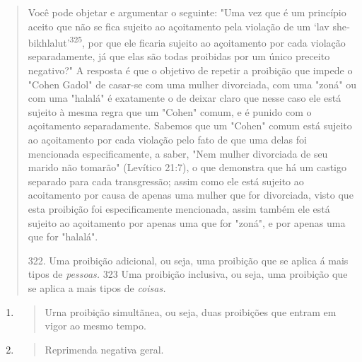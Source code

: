 \begin{quote}
Você pode objetar e argumentar o seguinte: "Uma vez que é um prin­cípio
aceito que não se fica sujeito ao açoitamento pela violação de um `lav
she­bikhlalut'\textsuperscript{325}, por que ele ficaria sujeito ao
açoitamento por cada violação sepa­radamente, já que elas são todas
proibidas por um único preceito negativo?" A resposta é que o objetivo
de repetir a proibição que impede o "Cohen Gadol" de casar-se com uma
mulher divorciada, com uma "zoná" ou com uma "halalá" é exatamente o de
deixar claro que nesse caso ele está sujeito à mesma regra que um
"Cohen" comum, e é punido com o açoitamento separadamente. Sabe­mos que
um "Cohen" comum está sujeito ao açoitamento por cada violação pe­lo
fato de que uma delas foi mencionada especificamente, a saber, "Nem
mulher divorciada de seu marido não tomarão" (Levítico 21:7), o que
demonstra que há um castigo separado para cada transgressão; assim como
ele está sujeito ao acoitamento por causa de apenas uma mulher que for
divorciada, visto que esta proibição foi especificamente mencionada,
assim também ele está sujeito ao açoi­tamento por apenas uma que for
"zoná", e por apenas uma que for "halalá".

322. Uma proibição adicional, ou seja, uma proibição que se aplica á
mais tipos de \emph{pessoas.} 323 Uma proibição inclusiva, ou seja, uma
proibição que se aplica a mais tipos de \emph{coisas.}
\end{quote}

\begin{enumerate}
\def\labelenumi{\arabic{enumi}.}
\setcounter{enumi}{323}
\item
  \begin{quote}
  Urna proibição simultãnea, ou seja, duas proibições que entram em
  vigor ao mesmo tempo.
  \end{quote}
\item
  \begin{quote}
  Reprimenda negativa geral.
  \end{quote}
\end{enumerate}


